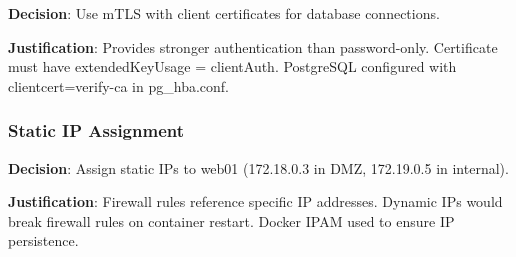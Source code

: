 \textbf{Decision}: Use mTLS with client certificates for database connections.

\textbf{Justification}: Provides stronger authentication than password-only. Certificate must have extendedKeyUsage = clientAuth. PostgreSQL configured with clientcert=verify-ca in pg\_hba.conf.

\subsubsection{Static IP Assignment}

\textbf{Decision}: Assign static IPs to web01 (172.18.0.3 in DMZ, 172.19.0.5 in internal).

\textbf{Justification}: Firewall rules reference specific IP addresses. Dynamic IPs would break firewall rules on container restart. Docker IPAM used to ensure IP persistence.
